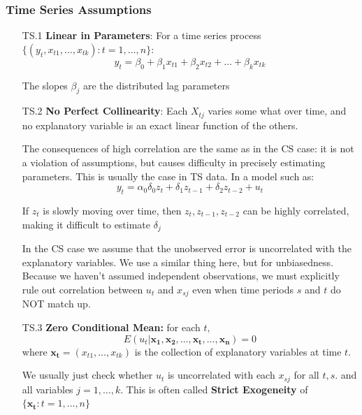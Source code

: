 \documentclass[11pt]{article}
\begin{document}
\begin{shaded}
\subsubsection{Time Series Assumptions}

\begin{enumerate}
    \item [TS.1] \textbf{Linear in Parameters}: For a time series process $\{(y_t, x_{t1}, \ldots, x_{tk}): t = 1, \ldots, n\}$:
    \[y_t = \beta_0 + \beta_1 x_{t1} + \beta_2 x_{t2} + \ldots + \beta_k x_{tk}\]
    \begin{note}
    The slopes $\beta_j$ are the distributed lag parameters
    \end{note}
    \item [TS.2] \textbf{No Perfect Collinearity}: Each $X_{tj}$ varies some what over time, and no explanatory variable is an exact linear function of the others. %

    The consequences of high correlation are the same as in the CS case: it is not a violation of assumptions, but causes difficulty in precisely estimating parameters. This is usually the case in TS data. In a model such as:
    \[y_t = \alpha_0 \delta_0 z_t + \delta_1 z_{t-1} + \delta_2 z_{t-2} + u_t\]

    If $z_t$ is slowly moving over time, then $z_t, z_{t-1}, z_{t-2}$ can be highly correlated, making it difficult to estimate $\delta_j$

    \begin{note}
        In the CS case we assume that the unobserved error is uncorrelated with the explanatory variables. We use a similar thing here, but for unbiasedness. Because we haven't assumed independent observations, we must explicitly rule out correlation between $u_t$ and $x_{sj}$ even when time periods $s$ and $t$ do NOT match up.
    \end{note}

    \item [TS.3] \textbf{Zero Conditional Mean:} for each $t,$
    \[E(u_t|\boldsymbol{x_1, x_2, \ldots, x_t, \ldots, x_n}) = 0\]
    where $\boldsymbol{x_t} = (x_{t1}, \ldots, x_{tk})$ is the collection of explanatory variables at time $t$.

    We usually just check whether $u_t$ is uncorrelated with each $x_{sj}$ for all $t, s$. and all variables $j = 1, \ldots, k$. This is often called  \textbf{Strict Exogeneity} of $\{\boldsymbol{x_t} : t = 1, \ldots, n \}$


\end{enumerate}
\end{shaded}
\end{document}
